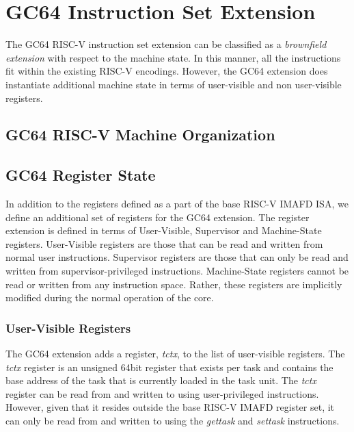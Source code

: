 \documentclass{article}
\begin{document}
\section{GC64 Instruction Set Extension}

The GC64 RISC-V instruction set extension can be classified as a \emph{brownfield extension} with respect to the machine state.  In this manner, all the instructions fit within the existing RISC-V encodings.  However, the GC64 extension does instantiate additional machine state in terms of user-visible and non user-visible registers.  

\subsection{GC64 RISC-V Machine Organization}

\subsection{GC64 Register State}
In addition to the registers defined as a part of the base RISC-V IMAFD ISA, we define an additional set of registers for the GC64 extension.  The register extension is defined in terms of User-Visible, Supervisor and Machine-State registers.  User-Visible registers are those that can be read and written from normal user instructions.  Supervisor registers are those that can only be read and written from supervisor-privileged instructions.  Machine-State registers cannot be read or written from any instruction space.  Rather, these registers are implicitly modified during the normal operation of the core.     

\subsubsection{User-Visible Registers} 
The GC64 extension adds a register, \emph{tctx}, to the list of user-visible registers.  The \emph{tctx} register is an unsigned 64bit register that exists per task and contains the base address of the task that is currently loaded in the task unit. The \emph{tctx} register can be read from and written to using user-privileged instructions.  However, given that it resides outside the base RISC-V IMAFD register set, it can only be read from and written to using the \emph{gettask} and \emph{settask} instructions.  
\end{document}
